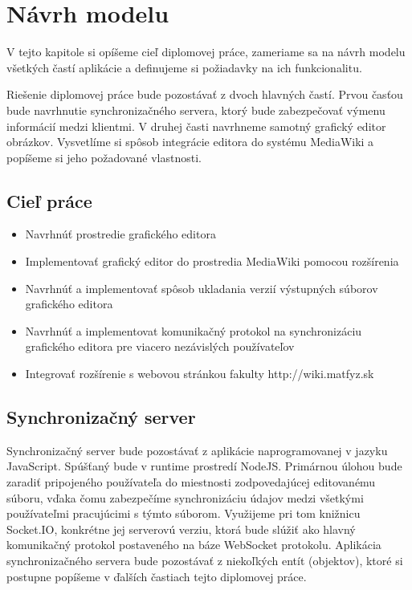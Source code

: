 \chapter{Návrh modelu}\label{chap:proposal}

V tejto kapitole si opíšeme cieľ diplomovej práce, zameriame sa na návrh modelu všetkých častí aplikácie a definujeme si požiadavky na ich funkcionalitu. 

Riešenie diplomovej práce bude pozostávať z dvoch hlavných častí. Prvou časťou bude navrhnutie synchronizačného servera, ktorý bude zabezpečovať výmenu informácií medzi klientmi. V druhej časti navrhneme samotný grafický editor obrázkov. Vysvetlíme si spôsob integrácie editora do systému MediaWiki a popíšeme si jeho požadované vlastnosti.

\section{Cieľ práce}
\begin{itemize}
	\item Navrhnúť prostredie grafického editora
	\item Implementovať grafický editor do prostredia MediaWiki pomocou rozšírenia
	\item Navrhnúť a implementovať spôsob ukladania verzií výstupných súborov grafického editora
	\item Navrhnúť a implementovat komunikačný protokol na synchronizáciu grafického editora pre viacero nezávislých používateľov
	\item Integrovať rozšírenie s webovou stránkou fakulty http://wiki.matfyz.sk
\end{itemize}

\section{Synchronizačný server}\label{sec:poziadavky_na_server}
Synchronizačný server bude pozostávať z aplikácie naprogramovanej v jazyku JavaScript. Spúšťaný bude v runtime prostredí NodeJS. Primárnou úlohou bude zaradiť pripojeného používateľa do miestnosti zodpovedajúcej editovanému súboru, vďaka čomu zabezpečíme synchronizáciu údajov medzi všetkými používateľmi pracujúcimi s týmto súborom. Využijeme pri tom knižnicu Socket.IO, konkrétne jej serverovú verziu, ktorá bude slúžiť ako hlavný komunikačný protokol postaveného na báze WebSocket protokolu. Aplikácia synchronizačného servera bude pozostávať z niekoľkých entít (objektov), ktoré si postupne popíšeme v ďalších častiach tejto diplomovej práce.

